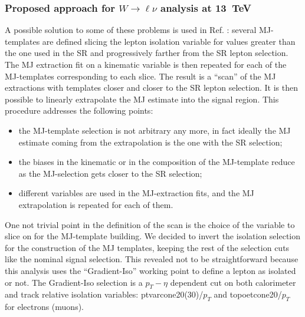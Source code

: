 
\subsubsection{Proposed approach for $W\rightarrow\ell\nu$ analysis at 13~TeV}
\label{sec:bkg_mj_approach}

A possible solution to some of these problems is used in Ref. \cite{Andari:1976186}: several MJ-templates are defined slicing the lepton isolation variable for values greater than the one used in the SR and progressively farther from the SR lepton selection.
The MJ extraction fit on a kinematic variable is then repeated for each of the MJ-templates corresponding to each slice. 
The result is a “scan” of the MJ extractions with templates closer and closer to the SR lepton selection.
It is then possible to linearly extrapolate the MJ estimate into the signal region.
This procedure addresses the following points:
\begin{itemize}
\item the MJ-template selection is not arbitrary any more, in fact ideally the MJ estimate coming from the extrapolation is the one with the SR selection;
\item the biases in the kinematic or in the composition of the MJ-template reduce as the MJ-selection gets closer to the SR selection;
\item different variables are used in the MJ-extraction fits, and the MJ extrapolation is repeated for each of them.
\end{itemize}


One not trivial point in the definition of the scan is the choice of the variable to slice on for the MJ-template building. 
We decided to invert the isolation selection for the construction of the MJ templates, keeping the rest of the selection cuts like the nominal signal selection.
This revealed not to be straightforward because this analysis uses the ``Gradient-Iso'' working point to define a lepton as isolated or not.
The Gradient-Iso selection is a $p_T - \eta$ dependent cut on both calorimeter and track relative isolation variables: ptvarcone20(30)/$p_T$ and topoetcone20/$p_T$ for electrons (muons).

